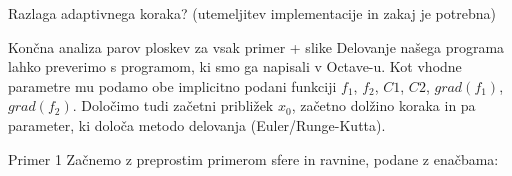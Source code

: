 \documentclass{beamer}
\begin{document}
	\begin{frame}{Razlaga adaptivnega koraka? (utemeljitev implementacije in zakaj je potrebna)}
		
	\end{frame}
	
	\begin{frame}{Končna analiza parov ploskev za vsak primer + slike}
		Delovanje našega programa lahko preverimo s programom, ki smo ga napisali v Octave-u. Kot vhodne parametre mu podamo obe implicitno podani funkciji $f_{1}$, $f_{2}$, $C1$, $C2$, $grad(f_{1})$, $grad(f_{2})$. Določimo tudi začetni približek $x_{0}$, začetno dolžino koraka in pa parameter, ki določa metodo delovanja (Euler/Runge-Kutta).
	\end{frame}
	
	\begin{frame}{Primer 1}
		Začnemo z preprostim primerom sfere in ravnine, podane z enačbama:\\
		

\end{frame}
\end{document}
